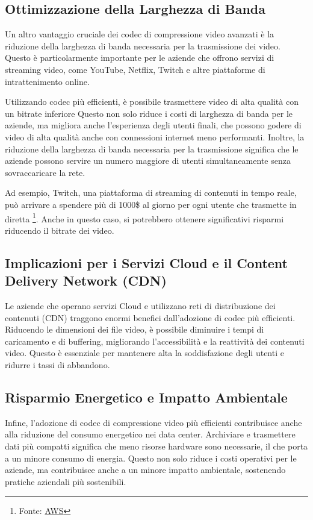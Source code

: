 \documentclass[a4paper,12pt, oneside]{article}
\begin{document}
\subsection{Ottimizzazione della Larghezza di Banda}
Un altro vantaggio cruciale dei codec di compressione video avanzati è la riduzione della larghezza di
banda necessaria per la trasmissione dei video. Questo è particolarmente importante per le aziende che
offrono servizi di streaming video, come YouTube, Netflix, Twitch e altre piattaforme di intrattenimento online.

Utilizzando codec più efficienti, è possibile trasmettere video di alta qualità con un bitrate inferiore
Questo non solo riduce i costi di larghezza di banda per le aziende, ma migliora anche l'esperienza degli
utenti finali, che possono godere di video di alta qualità anche con connessioni internet meno performanti.
Inoltre, la riduzione della larghezza di banda necessaria per la trasmissione significa che le aziende possono
servire un numero maggiore di utenti simultaneamente senza sovraccaricare la rete.

Ad esempio, Twitch, una piattaforma di streaming di contenuti in tempo reale, può arrivare a spendere più di
1000\$ al giorno per ogni utente che trasmette in diretta \footnote{Fonte: \href{https://ivs.rocks/calculator}{AWS}}.
Anche in questo caso, si potrebbero ottenere significativi risparmi riducendo il bitrate dei video.

\subsection{Implicazioni per i Servizi Cloud e il Content Delivery Network (CDN)}
Le aziende che operano servizi Cloud e utilizzano reti di distribuzione dei contenuti (CDN) traggono
enormi benefici dall'adozione di codec più efficienti. Riducendo le dimensioni dei file video, è
possibile diminuire i tempi di caricamento e di buffering, migliorando l'accessibilità e la reattività
dei contenuti video. Questo è essenziale per mantenere alta la soddisfazione degli utenti e ridurre i
tassi di abbandono.

\subsection{Risparmio Energetico e Impatto Ambientale}
Infine, l'adozione di codec di compressione video più efficienti contribuisce anche alla riduzione del
consumo energetico nei data center. Archiviare e trasmettere dati più compatti significa che meno
risorse hardware sono necessarie, il che porta a un minore consumo di energia. Questo non solo riduce
i costi operativi per le aziende, ma contribuisce anche a un minore impatto ambientale, sostenendo
pratiche aziendali più sostenibili.
\end{document}
